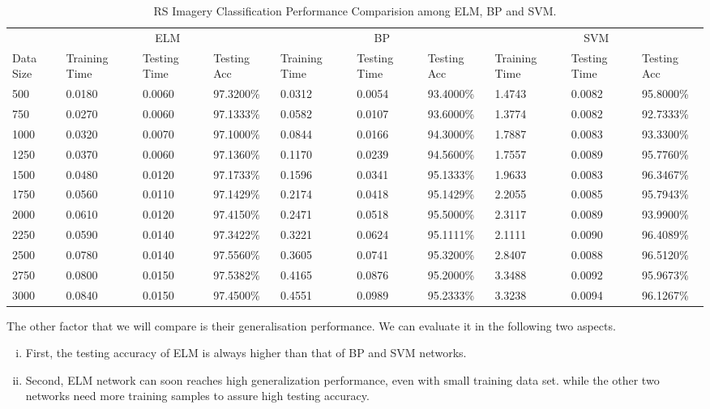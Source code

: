 \documentclass{elsart}
\begin{document}
\begin{table}[h]
\scriptsize{
\begin{center}
\begin{tabular}[bt]{|p{0.5cm}||p{0.93cm}|p{0.93cm}|p{1.14cm}||p{0.93cm}|p{0.93cm}|p{1.14cm}||p{0.93cm}|p{0.93cm}|p{1.14cm}|}\hline

 & \multicolumn{3}{|c||}{ELM} & \multicolumn{3}{|c||}{BP} & \multicolumn{3}{|c|}{SVM} \\ \cline{2-10}
Data Size &Training Time &Testing Time &Testing Acc &Training Time &Testing Time &Testing Acc &Training Time &Testing Time &Testing Acc \\ \hline
500 &0.0180 &0.0060 &97.3200\% &0.0312 &0.0054 &93.4000\% &1.4743 &0.0082 &95.8000\% \\ \hline
750 &0.0270 &0.0060 &97.1333\% &0.0582 &0.0107 &93.6000\% &1.3774 &0.0082 &92.7333\% \\ \hline
1000 &0.0320 &0.0070 &97.1000\% &0.0844 &0.0166 &94.3000\% &1.7887 &0.0083 &93.3300\% \\ \hline
1250 &0.0370 &0.0060 &97.1360\% &0.1170 &0.0239 &94.5600\% &1.7557 &0.0089 &95.7760\% \\ \hline
1500 &0.0480 &0.0120 &97.1733\% &0.1596 &0.0341 &95.1333\% &1.9633 &0.0083 &96.3467\% \\ \hline
1750 &0.0560 &0.0110 &97.1429\% &0.2174 &0.0418 &95.1429\% &2.2055 &0.0085 &95.7943\% \\ \hline
2000 &0.0610 &0.0120 &97.4150\% &0.2471 &0.0518 &95.5000\% &2.3117 &0.0089 &93.9900\% \\ \hline
2250 &0.0590 &0.0140 &97.3422\% &0.3221 &0.0624 &95.1111\% &2.1111 &0.0090 &96.4089\% \\ \hline
2500 &0.0780 &0.0140 &97.5560\% &0.3605 &0.0741 &95.3200\% &2.8407 &0.0088 &96.5120\% \\ \hline
2750 &0.0800 &0.0150 &97.5382\% &0.4165 &0.0876 &95.2000\% &3.3488 &0.0092 &95.9673\% \\ \hline
3000 &0.0840 &0.0150 &97.4500\% &0.4551 &0.0989 &95.2333\% &3.3238 &0.0094 &96.1267\% \\ \hline
\end{tabular}
\caption{RS Imagery Classification Performance Comparision among ELM, BP and SVM.}
\label{specification}
\end{center}
}
\end{table}

The other factor that we will compare is their generalisation performance.
We can evaluate it in the following two aspects.
\begin{enumerate}[(i)]
\item First, the testing accuracy of ELM is always higher than that of BP and SVM networks.
\item Second, ELM network can soon reaches high generalization performance, even with small training data set.
while the other two networks need more training samples to assure high testing accuracy.
\end{enumerate}
\par
\end{document}
